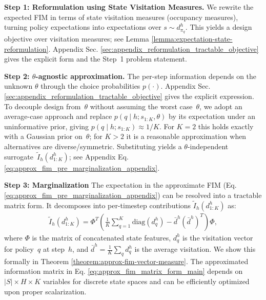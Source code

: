 \documentclass{article}
\begin{document}
\textbf{Step 1: Reformulation using State Visitation Measures.}
We rewrite the expected FIM in terms of state visitation measures (occupancy measures), turning policy expectations into expectations over $s \sim d^h_{\pi_q}$. This yields a design objective over visitation measures; see Lemma \ref{lemma:expectation-state-reformulation}. Appendix Sec. \ref{sec:appendix_reformulation_tractable_objective} gives the explicit form and the Step~1 problem statement. 

\textbf{Step 2: $\theta$-agnostic approximation.}
The per-step information depends on the unknown $\theta$ through the choice probabilities $p(\cdot)$. Appendix Sec. \ref{sec:appendix_reformulation_tractable_objective} gives the explicit expression. To decouple design from~$\theta$ without assuming the worst case~$\theta$, we adopt an average-case approach and replace $p(q\mid h; s_{1:K}, \theta)$ by its expectation under an uninformative prior, giving $p(q\mid h; s_{1:K}) \approx 1/K$. For $K{=}2$ this holds exactly with a Gaussian prior on~$\theta$; for $K{>}2$ it is a reasonable approximation when alternatives are diverse/symmetric. Substituting yields a $\theta$-independent surrogate~$\tilde{I}_h(d^h_{1:K})$; see Appendix Eq. \ref{eq:approx_fim_pre_marginalization_appendix}.

\textbf{Step 3: Marginalization}
The expectation in the approximate FIM (Eq. \ref{eq:approx_fim_pre_marginalization_appendix}) can be resolved into a tractable matrix form. It decomposes into per-timestep contributions $\tilde{I}_{ h}(d_{1:K}^h)$ as:
\begin{align}
\tilde{I}_{h}(d_{1:K}^h) = \Phi^T \left( \frac{1}{K} \sum_{q=1}^K \mathrm{diag}(d^h_q) - \bar{d}^h (\bar{d}^h)^T \right) \Phi, \label{eq:approx_fim_matrix_form_main}
\end{align}
where $\Phi$ is the matrix of concatenated state features, $d^h_q$ is the visitation vector for policy~$q$ at step~$h$, and $\bar{d}^h = \frac{1}{K} \sum_q d^h_q$ is the average visitation.
We show this formally in Theorem \ref{theorem:approx-fim-vector-measure}. The approximated information matrix in Eq. \eqref{eq:approx_fim_matrix_form_main} depends on $|S|{\times}H{\times}K$ variables for discrete state spaces and can be efficiently optimized upon proper scalarization. 
\end{document}
